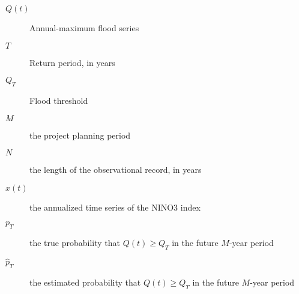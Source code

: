 \documentclass[12pt]{article}
\begin{document}
\begin{description}
  \item[\( Q(t) \)] Annual-maximum flood series
  \item[\( T \)] Return period, in years
  \item[\( Q_T \)] Flood threshold
  \item[\( M \)] the project planning period
  \item[\( N \)] the length of the observational record, in years
  \item[\( x(t) \)] the annualized time series of the NINO3 index
  \item[\( p_T \)] the true probability that \( Q(t) \geq Q_T \) in the future $M$-year period
  \item[\( \hat{p}_T \)] the estimated probability that \( Q(t) \geq Q_T \) in the future $M$-year period
\end{description}

\printbibliography{}
\end{document}

